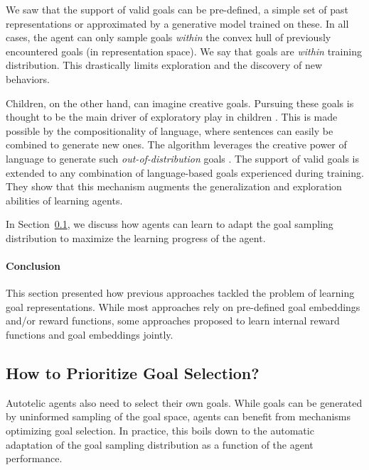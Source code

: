 We saw that the support of valid goals can be pre-defined, a simple set of past representations or approximated by a generative model trained on these. In all cases, the agent can only sample goals \textit{within} the convex hull of previously encountered goals (in representation space). We say that goals are \textit{within} training distribution. This drastically limits exploration and the discovery of new behaviors.

Children, on the other hand, can imagine creative goals. Pursuing these goals is thought to be the main driver of exploratory play in children \cite{chu2020exploratory}. This is made possible by the compositionality of language, where sentences can easily be combined to generate new ones. The \imagine algorithm leverages the creative power of language to generate such \textit{out-of-distribution} goals \cite{imagine}. The support of valid goals is extended to any combination of language-based goals experienced during training. They show that this mechanism augments the generalization and exploration abilities of learning agents.

In Section~\ref{sec:survey_generation}, we discuss how agents can learn to adapt the goal sampling distribution
to maximize the learning progress of the agent.

\paragraph{Conclusion}
This section presented how previous approaches tackled the problem of learning goal representations. While most approaches rely on pre-defined goal embeddings and/or reward functions, some approaches proposed to learn internal reward functions and goal embeddings jointly.



\subsection{How to Prioritize Goal Selection?}
\label{sec:survey_generation}

Autotelic agents also need to select their own goals. While goals can be generated by uninformed sampling of the goal space, agents can benefit from mechanisms optimizing goal selection. In practice, this boils down to the automatic adaptation of the goal sampling distribution as a function of the agent performance.

